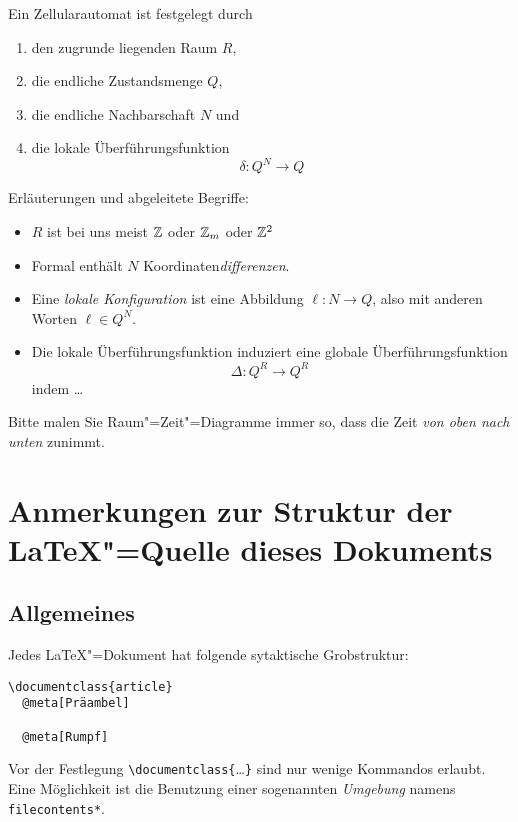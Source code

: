 Ein Zellularautomat ist festgelegt durch
%
\begin{enumerate}[noitemsep]
\item den zugrunde liegenden Raum $R$,
\item die endliche Zustandsmenge $Q$,
\item die endliche Nachbarschaft $N$ und
\item die lokale Überführungsfunktion
  \[
  \delta: Q^N \to Q
  \]
\end{enumerate}
%
Erläuterungen und abgeleitete Begriffe:
%
\begin{itemize}[noitemsep]
\item $R$ ist bei uns meist $\mathbb{Z}$ oder $\mathbb{Z}_m$ oder $\mathbb{Z}^2$
\item Formal enthält $N$ Koordinaten\emph{differenzen}.
\item Eine \emph{lokale Konfiguration} ist eine Abbildung $\ell:N\to Q$, also
  mit anderen Worten $\ell\in Q^N$.
\item Die lokale Überführungsfunktion induziert eine globale
  Überführungsfunktion
  \[
    \Delta: Q^R \to Q^R \;
  \]
  indem \dots
\end{itemize}
%
Bitte malen Sie Raum"=Zeit"=Diagramme immer so, dass die Zeit \emph{von oben
  nach unten} zunimmt.


\section{Anmerkungen zur Struktur der \LaTeX"=Quelle dieses Dokuments}
\label{sec:dokument-struktur}

\subsection{Allgemeines}

Jedes \LaTeX"=Dokument hat folgende sytaktische Grobstruktur:

\begin{tcolorbox}
\begin{Verbatim}[commandchars=\@\[\]]
\documentclass{article}
  @meta[Präambel]

  @meta[Rumpf]

\end{Verbatim}
\end{tcolorbox}

Vor der Festlegung \verb|\documentclass{|\dots\verb|}| sind nur wenige
Kommandos erlaubt.
%
Eine Möglichkeit ist die Benutzung einer sogenannten \emph{Umgebung} namens
\verb|filecontents*|.


